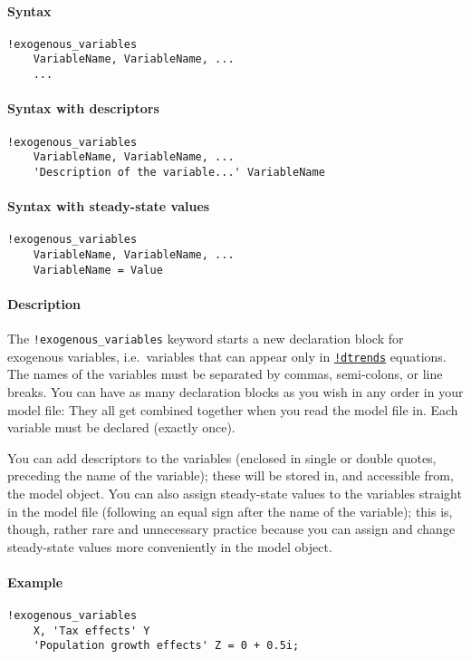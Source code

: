 


	\paragraph{Syntax}\label{syntax}

\begin{verbatim}
!exogenous_variables
    VariableName, VariableName, ...
    ...
\end{verbatim}

\paragraph{Syntax with descriptors}\label{syntax-with-descriptors}

\begin{verbatim}
!exogenous_variables
    VariableName, VariableName, ...
    'Description of the variable...' VariableName
\end{verbatim}

\paragraph{Syntax with steady-state
values}\label{syntax-with-steady-state-values}

\begin{verbatim}
!exogenous_variables
    VariableName, VariableName, ...
    VariableName = Value
\end{verbatim}

\paragraph{Description}\label{description}

The \texttt{!exogenous\_variables} keyword starts a new declaration
block for exogenous variables, i.e.~variables that can appear only in
\href{modellang/dtrends}{\texttt{!dtrends}} equations. The names of the
variables must be separated by commas, semi-colons, or line breaks. You
can have as many declaration blocks as you wish in any order in your
model file: They all get combined together when you read the model file
in. Each variable must be declared (exactly once).

You can add descriptors to the variables (enclosed in single or double
quotes, preceding the name of the variable); these will be stored in,
and accessible from, the model object. You can also assign steady-state
values to the variables straight in the model file (following an equal
sign after the name of the variable); this is, though, rather rare and
unnecessary practice because you can assign and change steady-state
values more conveniently in the model object.

\paragraph{Example}\label{example}

\begin{verbatim}
!exogenous_variables
    X, 'Tax effects' Y
    'Population growth effects' Z = 0 + 0.5i;
\end{verbatim}


